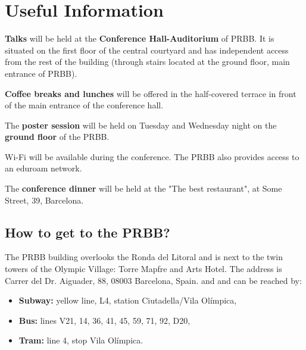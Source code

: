 \documentclass[
openany, %
parskip=full, %
12pt, %
a4paper, %
]{conferencebooklet} %
\begin{document}
	
	\chapter{Useful Information}
	
	\textbf{Talks} will be held at the \textbf{Conference Hall-Auditorium} of PRBB. It is situated on the first floor of the central courtyard and
	has independent access from the rest of the building (through stairs located at the ground floor, main entrance of PRBB). 
	
	\textbf{Coffee breaks and lunches} will be offered in the half-covered terrace in front of the main entrance of the conference hall.
	
	The \textbf{poster session} will be held on Tuesday and Wednesday night on the \textbf{ground floor} of the PRBB. 
	
	Wi-Fi will be available during the conference. The PRBB also provides access to an eduroam network.
	
	The \textbf{conference dinner} will be held at the "The best restaurant", at Some Street, 39, Barcelona.
	
	\section{How to get to the PRBB?}
	
	The PRBB building overlooks the Ronda del Litoral and is next to the twin towers of the Olympic Village: Torre Mapfre and Arts Hotel. The address is Carrer del Dr. Aiguader, 88, 08003 Barcelona, Spain. and and can be reached by:
	
	\begin{itemize}
		\item \textbf{Subway:} yellow line, L4, station Ciutadella/Vila Ol\'{i}mpica,
		\item \textbf{Bus:} lines V21, 14, 36, 41, 45, 59, 71, 92, D20,
		\item \textbf{Tram:} line 4, stop Vila Ol\'{i}mpica.
	\end{itemize}
	
	\newpage
	
\end{document}
